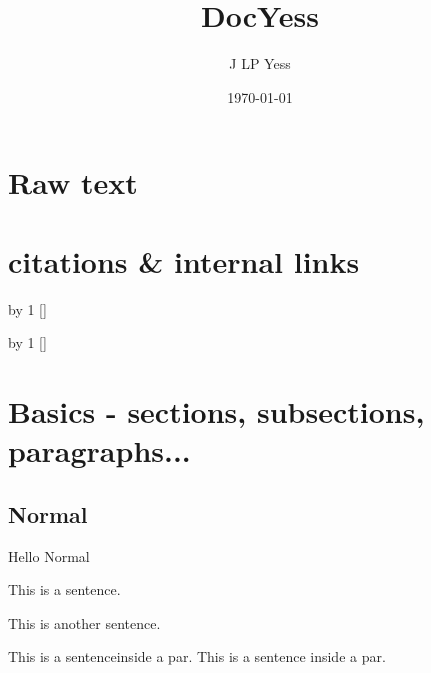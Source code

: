\documentclass{article}
\title{DocYess}
\author{J LP Yess}
\date{\today}
\begin{document}
\onehalfspacing
\maketitle

\listoffigures

{ %
  \hypersetup{linkcolor = black} 
  \tableofcontents
}

% 
%
%
%
%


\section{Raw text}

\lipsum

\section{citations \& internal links}

\newcount\citecounter
{}

\newcommand{\mycite}[1]{%
  \advance\citecounter by 1
  \edef\temp{\the\citecounter}%
  \hyperlink{#1}{[\temp]}
}

\mycite{cit1}

\mycite{cit2}

\section{Basics - sections, subsections, paragraphs...}
\subsection{Normal}

Hello Normal

This is a sentence.

This is another sentence.

This is a sentenceinside a par.
This is a sentence inside a par.
\end{document}
